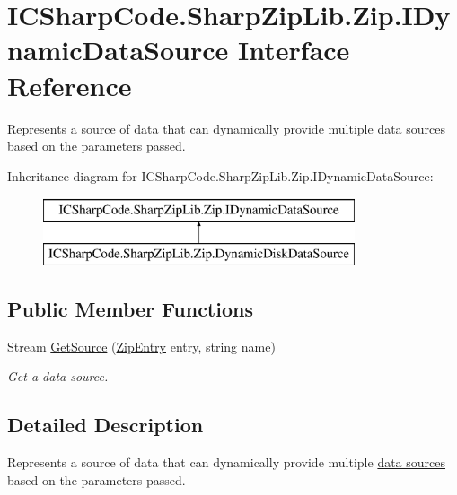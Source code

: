 \hypertarget{interface_i_c_sharp_code_1_1_sharp_zip_lib_1_1_zip_1_1_i_dynamic_data_source}{}\section{I\+C\+Sharp\+Code.\+Sharp\+Zip\+Lib.\+Zip.\+I\+Dynamic\+Data\+Source Interface Reference}
\label{interface_i_c_sharp_code_1_1_sharp_zip_lib_1_1_zip_1_1_i_dynamic_data_source}


Represents a source of data that can dynamically provide multiple \hyperlink{}{data sources} based on the parameters passed.  


Inheritance diagram for I\+C\+Sharp\+Code.\+Sharp\+Zip\+Lib.\+Zip.\+I\+Dynamic\+Data\+Source\+:\begin{figure}[H]
\begin{center}
\leavevmode
\includegraphics[height=2.000000cm]{interface_i_c_sharp_code_1_1_sharp_zip_lib_1_1_zip_1_1_i_dynamic_data_source}
\end{center}
\end{figure}
\subsection*{Public Member Functions}
\begin{DoxyCompactItemize}
\item 
Stream \hyperlink{interface_i_c_sharp_code_1_1_sharp_zip_lib_1_1_zip_1_1_i_dynamic_data_source_a33808af75b8f68dc18b7fcd55a5f951f}{Get\+Source} (\hyperlink{class_i_c_sharp_code_1_1_sharp_zip_lib_1_1_zip_1_1_zip_entry}{Zip\+Entry} entry, string name)
\begin{DoxyCompactList}\small\item\em Get a data source. \end{DoxyCompactList}\end{DoxyCompactItemize}


\subsection{Detailed Description}
Represents a source of data that can dynamically provide multiple \hyperlink{}{data sources} based on the parameters passed. 




